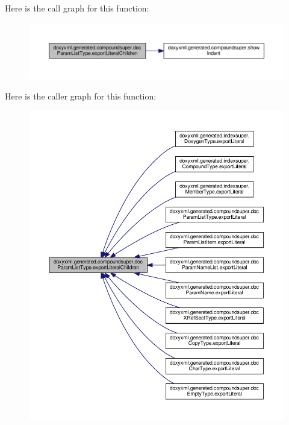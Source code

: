 Here is the call graph for this function\+:
\nopagebreak
\begin{figure}[H]
\begin{center}
\leavevmode
\includegraphics[width=350pt]{d2/d0c/classdoxyxml_1_1generated_1_1compoundsuper_1_1docParamListType_ad9b1a51982d3bb240279a9960526a19d_cgraph}
\end{center}
\end{figure}




Here is the caller graph for this function\+:
\nopagebreak
\begin{figure}[H]
\begin{center}
\leavevmode
\includegraphics[width=350pt]{d2/d0c/classdoxyxml_1_1generated_1_1compoundsuper_1_1docParamListType_ad9b1a51982d3bb240279a9960526a19d_icgraph}
\end{center}
\end{figure}


